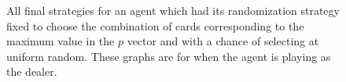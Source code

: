 \begin{figure}
\caption{
	All final strategies for an agent which had its randomization strategy fixed
	to choose the combination of cards corresponding to the maximum value in
	the $p$ vector and with a chance of selecting at uniform random.
	These graphs are for when the agent is playing as the dealer.
}
\label{fig:expts-rand-strats}
\end{figure}
